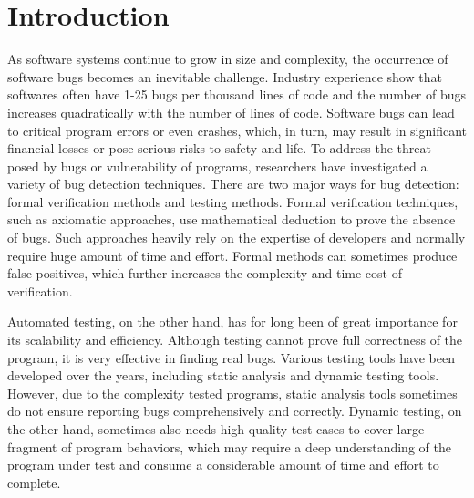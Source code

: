 \chapter{\label{cha:intro}Introduction}

\listoftodos{}

As software systems continue to grow in size and complexity, the occurrence of software bugs becomes an inevitable challenge. Industry experience show that softwares often have 1-25 bugs per thousand lines of code\cite{code-complete} and the number of bugs increases quadratically with the number of lines of code\cite{month}. Software bugs can lead to critical program errors or even crashes, which, in turn, may result in significant financial losses\cite{bug4} or pose serious risks to safety and life\cite{bug1, bug2, bug3}. To address the threat posed by bugs or vulnerability of programs, researchers have investigated a variety of bug detection techniques. There are two major ways for bug detection: formal verification methods and testing methods. Formal verification techniques, such as axiomatic approaches, use mathematical deduction to prove the absence of bugs. Such approaches heavily rely on the expertise of developers and normally require huge amount of time and effort\cite{sel4}. Formal methods can sometimes produce false positives, which further increases the complexity and time cost of verification.


Automated testing, on the other hand, has for long been of great importance for its scalability and efficiency. Although testing cannot prove full correctness of the program, it is very effective in finding real bugs. Various testing tools have been developed over the years, including static analysis\cite{infer, RacerD} and dynamic testing tools\cite{ASAN, TSAN}. However, due to the complexity tested programs, static analysis tools sometimes do not ensure reporting bugs comprehensively and correctly. Dynamic testing, on the other hand, sometimes also needs high quality test cases to cover large fragment of program behaviors, which may require a deep understanding of the program under test and consume a considerable amount of time and effort to complete. 


